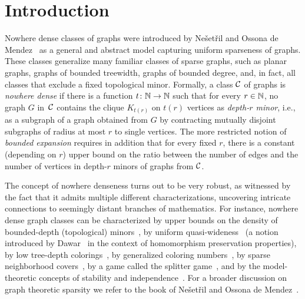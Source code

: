 \section{Introduction}\label{sec:intro}

Nowhere dense classes of graphs were introduced 
by Ne\v set\v ril and Ossona de 
Mendez~\cite{nevsetvril2010first,nevsetvril2011nowhere} as a 
general and abstract model
capturing uniform sparseness of graphs. These classes generalize many 
familiar classes of sparse graphs, such as planar graphs, graphs 
of bounded treewidth,  graphs of bounded degree, and, in fact, 
all classes that exclude a fixed 
topological minor.
Formally, a class $\mathcal{C}$ of graphs is {\em{nowhere dense}} if there is a function $t\colon \mathbb{N}\to \mathbb{N}$ such that for every $r\in \mathbb{N}$, 
no graph $G$ in~$\mathcal{C}$ contains the clique $K_{t(r)}$ on $t(r)$ vertices  as  {\em{depth-$r$ minor}},
i.e., as a subgraph of a graph obtained from $G$ by contracting mutually disjoint  subgraphs of radius at most $r$ to single vertices.
The more restricted notion of {\em{bounded expansion}} requires in addition that for every fixed $r$, there is a constant (depending on $r$) upper bound on the ratio 
between the number of edges and the number of vertices in depth-$r$ minors of graphs from $\mathcal{C}$.

The concept of nowhere denseness
turns out to be very robust, as witnessed by the fact that 
it admits multiple different characterizations, uncovering intricate connections to seemingly distant branches of mathematics.
For instance,  nowhere dense graph classes can be characterized 
by upper bounds on the density of bounded-depth (topological) 
minors~\cite{nevsetvril2010first,nevsetvril2011nowhere},
by uniform quasi-wideness~\cite{nevsetvril2011nowhere} (a notion introduced by
Dawar~\cite{dawar2010homomorphism} in the context of homomorphism
preservation properties), by low tree-depth
colorings~\cite{nevsetvril2008grad}, by generalized coloring
numbers~\cite{zhu2009coloring}, by sparse neighborhood
covers~\cite{GroheKRSS15,grohe2014deciding}, by a game called the
splitter game~\cite{grohe2014deciding}, and by the model-theoretic
concepts of stability and independence~\cite{adler2014interpreting}.
For a broader discussion on graph theoretic sparsity we refer to the book
of Ne\v{s}et\v{r}il and Ossona de Mendez~\cite{sparsity}.

